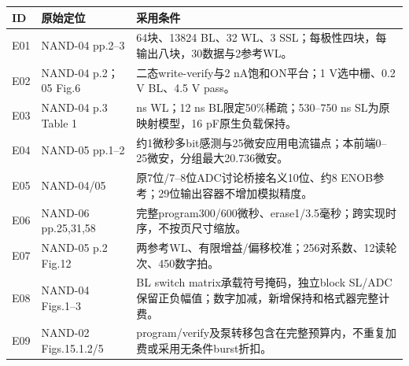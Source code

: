 \begingroup\small
\begin{longtable}{@{}>{\raggedright\arraybackslash}p{13mm}>{\raggedright\arraybackslash}p{32mm}>{\raggedright\arraybackslash}p{100mm}@{}}\toprule ID & 原始定位 & 采用条件\\\midrule\endhead
E01 & NAND-04 pp.2--3 & 64块、13824 BL、32 WL、3 SSL；每极性四块，每输出八块，30数据与2参考WL。\\
E02 & NAND-04 p.2；05 Fig.6 & 二态write-verify与2 nA饱和ON平台；1 V选中栅、0.2 V BL、4.5 V pass。\\
E03 & NAND-04 p.3 Table 1 & 303 ns WL；12 ns BL限定50\%稀疏；530--750 ns SL为原映射模型，16 pF原生负载保持。\\
E04 & NAND-05 pp.1--2 & 约1微秒多bit感测与25微安应用电流锚点；本前端0--25微安，分组最大20.736微安。\\
E05 & NAND-04/05 & 原7位/7--8位ADC讨论桥接名义10位、约8 ENOB参考；29位输出容器不增加模拟精度。\\
E06 & NAND-06 pp.25,31,58 & 完整program300/600微秒、erase1/3.5毫秒；跨实现时序，不按页尺寸缩放。\\
E07 & NAND-05 p.2 Fig.12 & 两参考WL、有限增益/偏移校准；256对系数、12读轮次、450数字拍。\\
E08 & NAND-04 Figs.1--3 & BL switch matrix承载符号掩码，独立block SL/ADC保留正负幅值；数字加减，新增保持和格式器完整计费。\\
E09 & NAND-02 Figs.15.1.2/5 & program/verify及泵转移包含在完整预算内，不重复加费或采用无条件burst折扣。\\
\bottomrule\end{longtable}\endgroup
